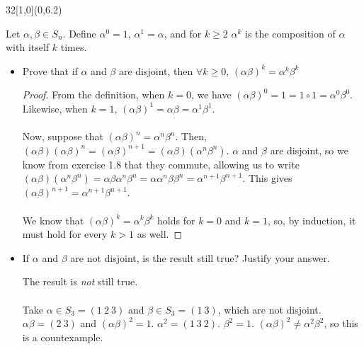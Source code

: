 \documentclass[12pt]{article}
\newenvironment{exercise}[2]{\begin{textblock}{32}[1,0](0,#2)\noindent#1\end{textblock}}{\vspace{1in}}
\begin{document}
\begin{exercise}{1.10}{6.2}
  {\noindent}Let $\alpha, \beta\in S_n$. Define $\alpha^0=1$, $\alpha^1=\alpha$, and for $k\ge 2$ $\alpha^k$ is the composition of $\alpha$ with itself $k$ times.
  \begin{itemize}
    \item Prove that if $\alpha$ and $\beta$ are disjoint, then $\forall k\ge0$, $(\alpha\beta)^k=\alpha^k\beta^k$
    \bigskip

  	\begin{proof}
			From the definition, when $k=0$, we have $(\alpha\beta)^0 = 1 = 1\circ 1 = \alpha^0\beta^0$.
			Likewise, when $k=1$, $(\alpha\beta)^1 = \alpha\beta = \alpha^1\beta^1$.\\
			\\
			Now, suppose that $(\alpha\beta)^n = \alpha^n\beta^n$.
			Then, $(\alpha\beta)(\alpha\beta)^n = (\alpha\beta)^{n+1} = (\alpha\beta)(\alpha^n\beta^n)$.
			$\alpha$ and $\beta$ are disjoint, so we know from exercise 1.8 that they commute, allowing us to write
			$(\alpha\beta)(\alpha^n\beta^n)=\alpha\beta\alpha^n\beta^n=\alpha\alpha^n\beta\beta^n=\alpha^{n+1}\beta^{n+1}$.
			This gives $(\alpha\beta)^{n+1} = \alpha^{n+1}\beta^{n+1}$.\\
			\\
			We know that $(\alpha\beta)^k=\alpha^k\beta^k$ holds for $k=0$ and $k=1$, so, by induction, it must hold for every $k>1$ as well.
  	\end{proof}
  	\vspace{1in}

    \item If $\alpha$ and $\beta$ are not disjoint, is the result still true? Justify your answer.
	  \bigskip

		The result is \textit{not} still true.\\
		\\
		Take $\alpha\in S_3 = (1\ 2\ 3)$ and $\beta\in S_3 = (1\ 3)$, which are not disjoint. $\alpha\beta = (2\ 3)$ and $(\alpha\beta)^2 = 1$. $\alpha^2 = (1\ 3\ 2)$. $\beta^2 = 1$.
		$(\alpha\beta)^2 \neq \alpha^2\beta^2$, so this is a countexample.
  \end{itemize}
\end{exercise}
\end{document}

